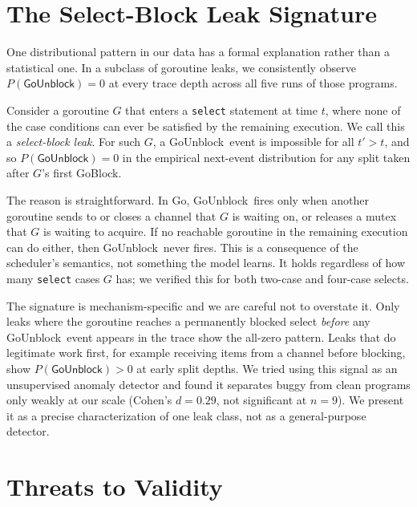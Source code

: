 \documentclass{svproc}
\newcommand{\pblock}{\textsf{GoBlock}}
\newcommand{\punblock}{\textsf{GoUnblock}}
\begin{document}
\section{The Select-Block Leak Signature}\label{sec:signature}

One distributional pattern in our data has a formal explanation rather
than a statistical one. In a subclass of goroutine leaks, we consistently
observe $P(\punblock)=0$ at every trace depth across all five runs of
those programs.

Consider a goroutine $G$ that enters a \texttt{select} statement at
time $t$, where none of the case conditions can ever be satisfied by the
remaining execution. We call this a \emph{select-block leak}. For such
$G$, a \punblock\ event is impossible for all $t' > t$, and so
$P(\punblock)=0$ in the empirical next-event distribution for any split
taken after $G$'s first \pblock.

The reason is straightforward. In Go, \punblock\ fires only when another
goroutine sends to or closes a channel that $G$ is waiting on, or
releases a mutex that $G$ is waiting to acquire. If no reachable
goroutine in the remaining execution can do either, then \punblock\
never fires. This is a consequence of the scheduler's semantics, not
something the model learns. It holds regardless of how many
\texttt{select} cases $G$ has; we verified this for both two-case and
four-case selects.

The signature is mechanism-specific and we are careful not to overstate
it. Only leaks where the goroutine reaches a permanently blocked select
\emph{before} any \punblock\ event appears in the trace show the
all-zero pattern. Leaks that do legitimate work first, for example
receiving items from a channel before blocking, show $P(\punblock)>0$
at early split depths. We tried using this signal as an unsupervised
anomaly detector and found it separates buggy from clean programs only
weakly at our scale (Cohen's $d=0.29$, not significant at $n{=}9$).
We present it as a precise characterization of one leak class, not as
a general-purpose detector.

\section{Threats to Validity}\label{sec:threats}
\end{document}
